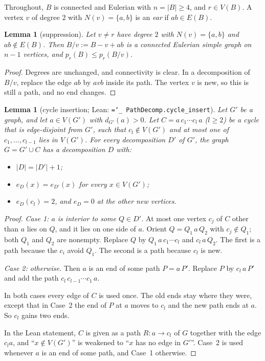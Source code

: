 \documentclass[11pt]{amsart}
\newtheorem{lemma}[theorem]{Lemma}
\theoremstyle{definition}
\newcommand{\pr}{p_r}
\newcommand{\lean}[1]{\texttt{\hyphenchar\font=`\_ #1}}
\begin{document}
Throughout, $B$ is connected and Eulerian with $n=|B|\ge 4$, and $r\in V(B)$. A vertex $v$ of degree $2$
with $N(v)=\{a,b\}$ is an \emph{ear} if $ab\in E(B)$.

\begin{lemma}[suppression]\label{lem:supp}
Let $v\ne r$ have degree $2$ with $N(v)=\{a,b\}$ and $ab\notin E(B)$. Then $B/v:=B-v+ab$ is a
connected Eulerian simple graph on $n-1$ vertices, and $\pr(B)\le\pr(B/v)$.
\end{lemma}

\begin{proof}
Degrees are unchanged, and connectivity is clear. In a decomposition of $B/v$, replace the edge $ab$
by $avb$ inside its path. The vertex $v$ is new, so this is still a path, and no end changes.
\end{proof}

\begin{lemma}[cycle insertion; Lean: \lean{PathDecomp.cycle\_insert}]\label{lem:ins}
Let $G'$ be a graph, and let $a\in V(G')$ with $d_{G'}(a)>0$. Let $C=a\,c_1\cdots c_l\,a$ ($l\ge2$) be a
cycle that is edge-disjoint from $G'$, such that $c_l\notin V(G')$ and at most one of
$c_1,\dots,c_{l-1}$ lies in $V(G')$. For every decomposition $D'$ of $G'$, the graph $G=G'\cup C$ has
a decomposition $D$ with:
\begin{itemize}
\item $|D|=|D'|+1$;
\item $e_D(x)=e_{D'}(x)$ for every $x\in V(G')$;
\item $e_D(c_l)=2$, and $e_D=0$ at the other new vertices.
\end{itemize}
\end{lemma}

\begin{proof}
\emph{Case 1: $a$ is interior to some $Q\in D'$.} At most one vertex $c_j$ of $C$ other than $a$ lies on
$Q$, and it lies on one side of $a$. Orient $Q=Q_1\,a\,Q_2$ with $c_j\notin Q_1$; both $Q_1$ and $Q_2$
are nonempty. Replace $Q$ by $Q_1\,a\,c_1\cdots c_l$ and $c_l\,a\,Q_2$. The first is a path because the
$c_i$ avoid $Q_1$. The second is a path because $c_l$ is new.

\emph{Case 2: otherwise.} Then $a$ is an end of some path $P=a\,P'$. Replace $P$ by $c_l\,a\,P'$ and add
the path $c_l\,c_{l-1}\cdots c_1\,a$.

In both cases every edge of $C$ is used once. The old ends stay where they were, except that in Case~2
the end of $P$ at $a$ moves to $c_l$ and the new path ends at $a$. So $c_l$ gains two ends.

In the Lean statement, $C$ is given as a path $R\colon a\to c_l$ of $G$ together with the edge $c_la$, and
``$x\notin V(G')$'' is weakened to ``$x$ has no edge in $G'$''. Case~2 is used whenever $a$ is an end of
some path, and Case~1 otherwise.
\end{proof}
\end{document}
